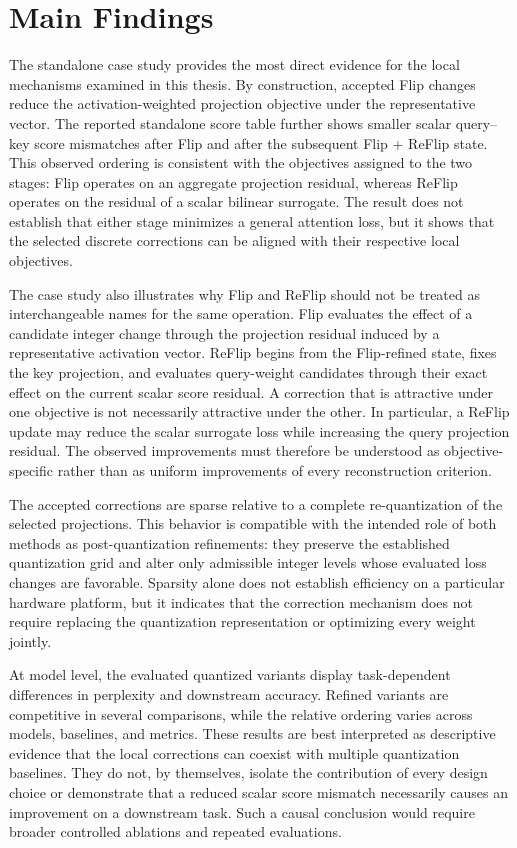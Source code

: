 \documentclass[../main.tex]{subfiles}
\begin{document}
\section{Main Findings}

The standalone case study provides the most direct evidence for the local mechanisms examined in this thesis. By construction, accepted Flip changes reduce the activation-weighted projection objective under the representative vector. The reported standalone score table further shows smaller scalar query--key score mismatches after Flip and after the subsequent Flip + ReFlip state. This observed ordering is consistent with the objectives assigned to the two stages: Flip operates on an aggregate projection residual, whereas ReFlip operates on the residual of a scalar bilinear surrogate. The result does not establish that either stage minimizes a general attention loss, but it shows that the selected discrete corrections can be aligned with their respective local objectives.

The case study also illustrates why Flip and ReFlip should not be treated as interchangeable names for the same operation. Flip evaluates the effect of a candidate integer change through the projection residual induced by a representative activation vector. ReFlip begins from the Flip-refined state, fixes the key projection, and evaluates query-weight candidates through their exact effect on the current scalar score residual. A correction that is attractive under one objective is not necessarily attractive under the other. In particular, a ReFlip update may reduce the scalar surrogate loss while increasing the query projection residual. The observed improvements must therefore be understood as objective-specific rather than as uniform improvements of every reconstruction criterion.

The accepted corrections are sparse relative to a complete re-quantization of the selected projections. This behavior is compatible with the intended role of both methods as post-quantization refinements: they preserve the established quantization grid and alter only admissible integer levels whose evaluated loss changes are favorable. Sparsity alone does not establish efficiency on a particular hardware platform, but it indicates that the correction mechanism does not require replacing the quantization representation or optimizing every weight jointly.

At model level, the evaluated quantized variants display task-dependent differences in perplexity and downstream accuracy. Refined variants are competitive in several comparisons, while the relative ordering varies across models, baselines, and metrics. These results are best interpreted as descriptive evidence that the local corrections can coexist with multiple quantization baselines. They do not, by themselves, isolate the contribution of every design choice or demonstrate that a reduced scalar score mismatch necessarily causes an improvement on a downstream task. Such a causal conclusion would require broader controlled ablations and repeated evaluations.
\end{document}
